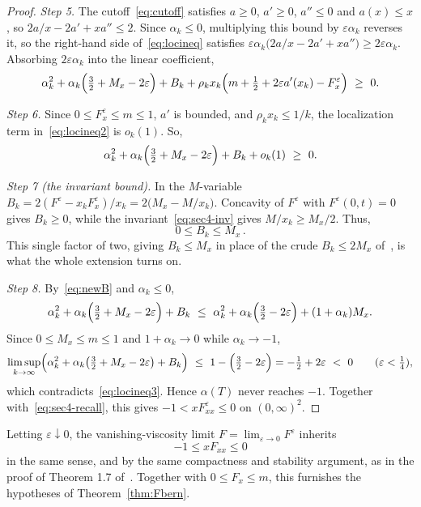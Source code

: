 \documentclass[12pt]{amsart}
\numberwithin{equation}{section}
\theoremstyle{plain}
\theoremstyle{definition}
\newcommand{\eps}{\varepsilon}
\begin{document}
\begin{proof}
	\emph{Step 5.}
	The cutoff~\eqref{eq:cutoff} satisfies $a\ge0$, $a'\ge0$, $a''\le0$ and
	$a(x)\le x$, so $2a/x-2a'+x a''\le2$. Since $\alpha_k\le0$, multiplying this
	bound by $\eps\alpha_k$ reverses it, so the right-hand side
	of~\eqref{eq:locineq} satisfies
	$\eps\alpha_k\bigl(2a/x-2a'+x a''\bigr)\ge 2\eps\alpha_k$.
	Absorbing
	$2\eps\alpha_k$ into the linear coefficient,
	\begin{equation}\label{eq:locineq2}
		\alpha_k^2+\alpha_k\Bigl(\tfrac32+M_x-2\eps\Bigr)+B_k
		+\rho_k x_k\Bigl(m+\tfrac12+2\eps a'(x_k)-F^\eps_x\Bigr)\ \ge\ 0 .
	\end{equation}

	\emph{Step 6.}
	Since $0\le F^\eps_x\le m\le1$, $a'$ is bounded, and $\rho_k x_k\le1/k$, the
	localization term in~\eqref{eq:locineq2} is $o_k(1)$. So,
	\begin{equation}\label{eq:locineq3}
		\alpha_k^2+\alpha_k\Bigl(\tfrac32+M_x-2\eps\Bigr)+B_k+o_k(1)\ \ge\ 0 .
	\end{equation}

	\emph{Step 7 (the invariant bound).}
	In the $M$-variable $B_k=2(F^\eps-x_k F^\eps_x)/x_k=2\bigl(M_x-M/x_k\bigr)$.
	Concavity of $F^\eps$ with $F^\eps(0,t)=0$ gives $B_k\ge0$, while the
	invariant~\eqref{eq:sec4-inv}
	gives $M/x_k\ge M_x/2$. Thus,
	\begin{equation}\label{eq:newB}
		0\le B_k\le M_x \,.
	\end{equation}
	This single factor of two, giving $B_k\le M_x$ in place of the crude
	$B_k\le2M_x$
	of~\cite{TV}, is what the whole extension turns on.

	\emph{Step 8.}
	By~\eqref{eq:newB} and $\alpha_k\le0$,
	\[
		\alpha_k^2+\alpha_k\Bigl(\tfrac32+M_x-2\eps\Bigr)+B_k
		\ \le\ \alpha_k^2+\alpha_k\Bigl(\tfrac32-2\eps\Bigr)+(1+\alpha_k)M_x .
	\]
	Since $0\le M_x\le m\le1$ and $1+\alpha_k\to0$ while $\alpha_k\to-1$,
	\begin{equation}\label{eq:firstcross}
		\limsup_{k\to\infty}\Bigl(\alpha_k^2+\alpha_k\bigl(\tfrac32+M_x-2\eps\bigr)
		+B_k\Bigr)\ \le\ 1-\Bigl(\tfrac32-2\eps\Bigr)=-\tfrac12+2\eps\ <\ 0
		\qquad(\eps<\tfrac14),
	\end{equation}
	which contradicts~\eqref{eq:locineq3}. Hence $\alpha(T)$ never reaches $-1$.
	Together with~\eqref{eq:sec4-recall}, this gives $-1<xF^\eps_{xx}\le0$ on
	$(0,\infty)^2$.
\end{proof}

Letting $\eps\downarrow0$, the vanishing-viscosity limit
$F=\lim_{\eps\to0}F^\eps$ inherits
\[
	-1\le xF_{xx}\le0
\]
in the same sense, and by the same compactness and stability argument, as in the
proof of Theorem 1.7 of~\cite{TV}. Together with $0\le F_x\le m$, this furnishes
the hypotheses of Theorem~\ref{thm:Fbern}.
\end{document}
